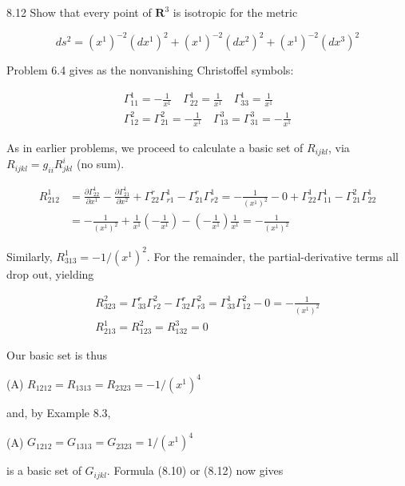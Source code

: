 \documentclass[10pt]{article}
\begin{document}
8.12 Show that every point of $\mathbf{R}^{3}$ is isotropic for the metric

$$
d s^{2}=\left(x^{1}\right)^{-2}\left(d x^{1}\right)^{2}+\left(x^{1}\right)^{-2}\left(d x^{2}\right)^{2}+\left(x^{1}\right)^{-2}\left(d x^{3}\right)^{2}
$$

Problem 6.4 gives as the nonvanishing Christoffel symbols:

$$
\begin{gathered}
\Gamma_{11}^{1}=-\frac{1}{x^{1}} \quad \Gamma_{22}^{1}=\frac{1}{x^{1}} \quad \Gamma_{33}^{1}=\frac{1}{x^{1}} \\
\Gamma_{12}^{2}=\Gamma_{21}^{2}=-\frac{1}{x^{1}} \quad \Gamma_{13}^{3}=\Gamma_{31}^{3}=-\frac{1}{x^{1}}
\end{gathered}
$$

As in earlier problems, we proceed to calculate a basic set of $R_{i j k l}$, via $R_{i j k l}=g_{i i} R_{j k l}^{i}$ (no sum).

$$
\begin{aligned}
R_{212}^{1} & =\frac{\partial \Gamma_{22}^{1}}{\partial x^{1}}-\frac{\partial \Gamma_{21}^{1}}{\partial x^{2}}+\Gamma_{22}^{r} \Gamma_{r 1}^{1}-\Gamma_{21}^{r} \Gamma_{r 2}^{1}=-\frac{1}{\left(x^{1}\right)^{2}}-0+\Gamma_{22}^{1} \Gamma_{11}^{1}-\Gamma_{21}^{2} \Gamma_{22}^{1} \\
& =-\frac{1}{\left(x^{1}\right)^{2}}+\frac{1}{x^{1}}\left(-\frac{1}{x^{1}}\right)-\left(-\frac{1}{x^{1}}\right) \frac{1}{x^{1}}=-\frac{1}{\left(x^{1}\right)^{2}}
\end{aligned}
$$

Similarly, $R_{313}^{1}=-1 /\left(x^{1}\right)^{2}$. For the remainder, the partial-derivative terms all drop out, yielding

$$
\begin{gathered}
R_{323}^{2}=\Gamma_{33}^{r} \Gamma_{r 2}^{2}-\Gamma_{32}^{r} \Gamma_{r 3}^{2}=\Gamma_{33}^{1} \Gamma_{12}^{2}-0=-\frac{1}{\left(x^{1}\right)^{2}} \\
R_{213}^{1}=R_{123}^{2}=R_{132}^{3}=0
\end{gathered}
$$

Our basic set is thus

(A) $R_{1212}=R_{1313}=R_{2323}=-1 /\left(x^{1}\right)^{4}$

and, by Example 8.3,

(A) $G_{1212}=G_{1313}=G_{2323}=1 /\left(x^{1}\right)^{4}$

is a basic set of $G_{i j k l}$. Formula (8.10) or (8.12) now gives
\end{document}
